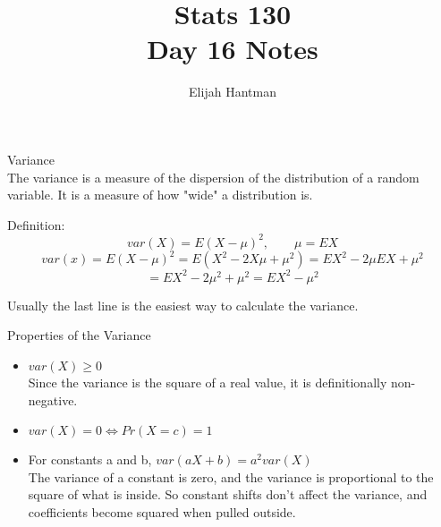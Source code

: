 \documentclass{report}
\title{\Huge{Stats 130}\\Day 16 Notes}
\author{\huge{Elijah Hantman}}
\date{}
\begin{document}
\maketitle
\newpage

\begin{description}
    \item {\large Variance} 
        \\
        The variance is a measure of the dispersion
        of the distribution of a random variable.
        It is a measure of how "wide" a distribution is.

        \begin{mdframed}
            Definition:
            \begin{displaymath}
                var(X) = E(X - \mu)^2, \qquad \mu = EX 
            \end{displaymath}
            \begin{displaymath}
                var(x) =
                E(X - \mu)^2 =
                E(X^2 - 2X\mu + \mu^2) =
                EX^2 - 2\mu EX + \mu^2
            \end{displaymath}
            \begin{displaymath}
                = EX^2 - 2\mu^2 + \mu^2 =
                EX^2 - \mu^2
            \end{displaymath}
            
            Usually the last line is the easiest way to
            calculate the variance.
        \end{mdframed}
    \item {\large Properties of the Variance} 
        \begin{mdframed}
            \begin{itemize}
                \item $var(X) \ge 0$\\
                    Since the variance is the square
                    of a real value, it is definitionally
                    non-negative.

                \item $var(X) = 0 \iff Pr(X=c) = 1$
                \item For constants a and b, $var(aX + b) = a^2var(X)$ 
                    \\
                    The variance of a constant is zero, and
                    the variance is proportional to the square
                    of what is inside. So constant shifts don't
                    affect the variance, and coefficients become
                    squared when pulled outside.


\end{itemize}
\end{mdframed}
\end{description}
\end{document}
